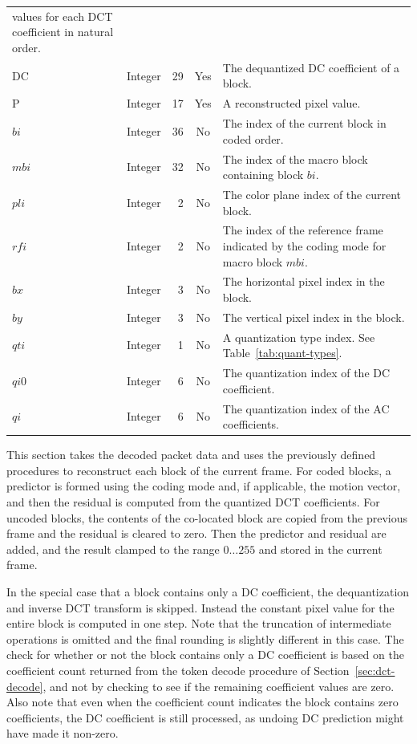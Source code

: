 \documentclass[9pt,letterpaper]{book}
\newcommand{\idx}[1]{{\ensuremath{\mathit{#1}}}}
\newcommand{\qti}{\idx{qti}}
\newcommand{\pli}{\idx{pli}}
\newcommand{\qi}{\idx{qi}}
\newcommand{\bi}{\idx{bi}}
\newcommand{\mbi}{\idx{mbi}}
\newcommand{\rfi}{\idx{rfi}}
\newcommand{\locvar}[1]{\ensuremath{\mathrm{#1}}}
\numberwithin{equation}{chapter}
\numberwithin{figure}{chapter}
\numberwithin{table}{chapter}
\begin{document}
\begin{tabularx}{\textwidth}{@{}llrcX@{}}
 values for each DCT coefficient in natural order. \\
\locvar{DC}        & Integer & 29 & Yes & The dequantized DC coefficient of a
 block. \\
\locvar{P}         & Integer & 17 & Yes & A reconstructed pixel value. \\
\locvar{\bi}       & Integer & 36 & No  & The index of the current block in
 coded order. \\
\locvar{\mbi}      & Integer & 32 & No  & The index of the macro block
 containing block \locvar{\bi}. \\
\locvar{\pli}      & Integer &  2 & No  & The color plane index of the current
 block. \\
\locvar{\rfi}      & Integer &  2 & No  & The index of the reference frame
 indicated by the coding mode for macro block \locvar{\mbi}. \\
\locvar{\idx{bx}}  & Integer &  3 & No  & The horizontal pixel index in the
 block. \\
\locvar{\idx{by}}  & Integer &  3 & No  & The vertical pixel index in the
 block. \\
\locvar{\qti}      & Integer &  1 & No  & A quantization type index.
See Table~\ref{tab:quant-types}.\\
\locvar{\idx{qi0}} & Integer &  6 & No  & The quantization index of the DC
 coefficient. \\
\locvar{\qi}       & Integer &  6 & No  & The quantization index of the AC
 coefficients. \\
\bottomrule\end{tabularx}
\medskip

This section takes the decoded packet data and uses the previously defined
 procedures to reconstruct each block of the current frame.
For coded blocks, a predictor is formed using the coding mode and, if
 applicable, the motion vector, and then the residual is computed from the
 quantized DCT coefficients.
For uncoded blocks, the contents of the co-located block are copied from the
 previous frame and the residual is cleared to zero.
Then the predictor and residual are added, and the result clamped to the range
 $0\ldots 255$ and stored in the current frame.

In the special case that a block contains only a DC coefficient, the
 dequantization and inverse DCT transform is skipped.
Instead the constant pixel value for the entire block is computed in one step.
Note that the truncation of intermediate operations is omitted and the final
 rounding is slightly different in this case.
The check for whether or not the block contains only a DC coefficient is based
 on the coefficient count returned from the token decode procedure of
 Section~\ref{sec:dct-decode}, and not by checking to see if the remaining
 coefficient values are zero.
Also note that even when the coefficient count indicates the block contains
 zero coefficients, the DC coefficient is still processed, as undoing DC
 prediction might have made it non-zero.
\end{document}
